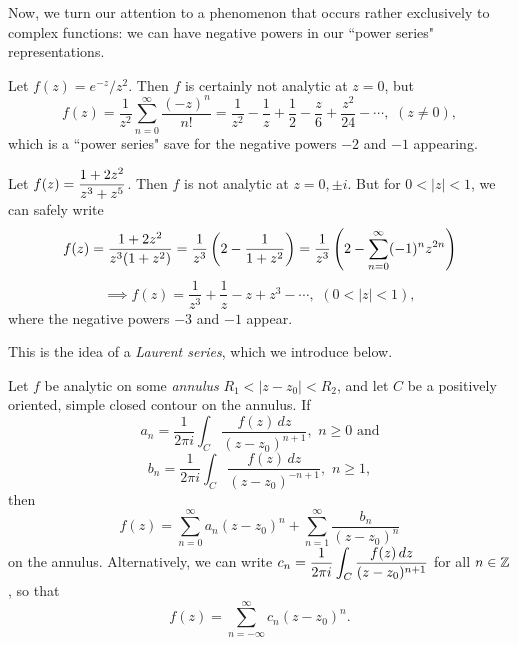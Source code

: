 \documentclass{article}
\begin{document}
Now, we turn our attention to a phenomenon that occurs rather exclusively to complex functions: we can have negative powers in our ``power series" representations.
\begin{example}
Let $f(z) = e^{-z}/z^2$. Then $f$ is certainly not analytic at $z=0$, but
$$f(z) = \frac 1{z^2}\sum_{n=0}^\infty \frac{(-z)^n}{n!} = \frac 1{z^2} - \frac 1z + \frac 12 - \frac z6 + \frac{z^2}{24}-\cdots, \,\, (z\neq 0),$$
which is a ``power series" save for the negative powers $-2$ and $-1$ appearing.
\end{example}
\begin{example}
Let $f(z) = \displaystyle \frac{1+2z^2}{z^3+z^5}$. Then $f$ is not analytic at $z = 0, \pm i$. But for $0< |z|< 1$, we can safely write
$$f(z) = \frac{1+2z^2}{z^3(1+z^2)} = \frac 1{z^3} \left(2 - \frac 1{1+z^2} \right) = \frac 1{z^3}\left(2 - \sum_{n=0}^\infty (-1)^nz^{2n} \right)$$
$$\implies f(z) = \frac 1{z^3} + \frac 1z - z + z^3 - \cdots, \,\, (0 < |z| < 1),$$
where the negative powers $-3$ and $-1$ appear.
\end{example}
This is the idea of a \textit{Laurent series}, which we introduce below.
\begin{theorem}
Let $f$ be analytic on some \textit{annulus} $R_1 < |z-z_0| < R_2$, and let $C$ be a positively oriented, simple closed contour on the annulus. If
$$a_n = \frac 1{2\pi i}\int_C \frac{f(z)\, dz}{(z -z_0)^{n+1}}, \,\, n\geq 0 \textrm{ and}$$
$$b_n = \frac 1{2\pi i}\int_C \frac{f(z)\, dz}{(z - z_0)^{-n+1}}, \,\, n\geq 1,$$
then
$$f(z) = \sum_{n=0}^\infty a_n(z-z_0)^n + \sum_{n=1}^\infty \frac{b_n}{(z-z_0)^n}$$
on the annulus. Alternatively, we can write $\displaystyle c_n = \frac 1{2\pi i}\int_C \frac{f(z)\, dz}{(z-z_0)^{n+1}}$ for all $n\in\mathbb Z$, so that
$$f(z) = \sum_{n=-\infty}^\infty c_n(z-z_0)^n.$$
\end{theorem}
\newpage
\setcounter{section}{82}
\end{document}
